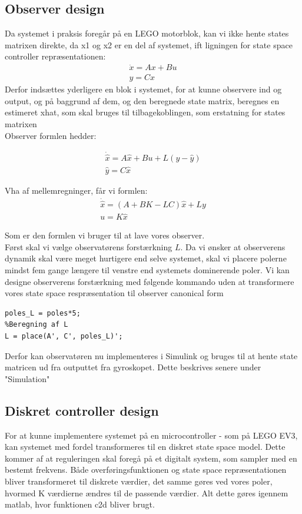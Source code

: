 \subsection{Observer design}
Da systemet i praksis foregår på en LEGO motorblok, kan vi ikke hente states matrixen direkte, da x1 og x2 er en del  af systemet, ift ligningen for state space controller repræsentationen: 
\begin{gather}
\dot{x}=Ax+Bu \\
y=Cx
\end{gather}
Derfor indsættes yderligere en blok i systemet, for at kunne observere ind og output, og på baggrund af dem, og den beregnede state matrix, beregnes en estimeret xhat, som skal bruges til tilbagekoblingen, som erstatning for states matrixen \\
Observer formlen hedder:


\begin{gather}
\dot{\hat{x}}=A\hat{x}+Bu+L(y-\hat{y}) \\
\hat{y}=C\hat{x}
\end{gather}

Vha af mellemregninger, får vi formlen: 
\begin{gather}
\dot{\hat{x}}=(A+BK-LC)\hat{x}+Ly \\
u=K\hat{x}
\end{gather}

Som er den formlen vi bruger til at lave vores observer.\\
Først skal vi vælge observatørens forstærkning $ L $. Da vi ønsker at observerens dynamik skal være meget hurtigere end selve systemet, skal vi placere polerne mindst fem gange længere til venstre end systemets dominerende poler. Vi kan designe observerens forstærkning med følgende kommando uden at transformere vores state space respræsentation til observer canonical form

\begin{lstlisting}[frame=single]
%Valg af poler er polerne ganget med 5
poles_L = poles*5; 
%Beregning af L
L = place(A', C', poles_L)'; 
\end{lstlisting}

Derfor kan observatøren nu implementeres i Simulink og bruges til at hente state matricen ud fra outputtet fra gyroskopet. Dette beskrives senere under "Simulation"

\subsection{Diskret controller design}
For at kunne implementere systemet på en microcontroller - som på LEGO EV3, kan systemet med fordel transformeres til en diskret state space model. Dette kommer af at reguleringen skal foregå på et digitalt system, som sampler med en bestemt frekvens. Både overføringsfunktionen og state space repræsentationen bliver transformeret til diskrete værdier, det samme gøres ved vores poler, hvormed K værdierne ændres til de passende værdier. Alt dette gøres igennem matlab, hvor funktionen c2d bliver brugt.


